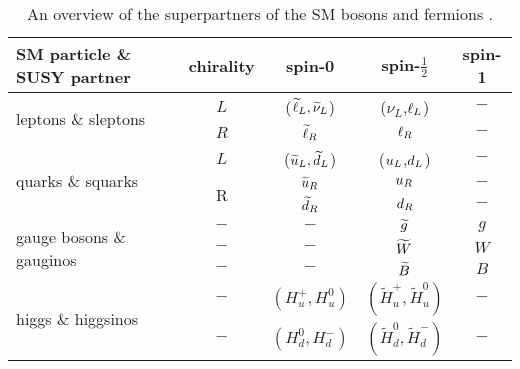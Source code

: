 \begin{table}[ht!]
\def\arraystretch{1.2}
\setlength{\belowcaptionskip}{6pt}
\small
\centering
\caption{An overview of the superpartners of the SM bosons and fermions \cite{Martin:1997ns}.}
\label{tab:susy}
\begin{tabular}{l c c c c }
        \hline \hline
        SM particle \& SUSY partner              & chirality         &spin-0                 & spin-$\frac{1}{2}$                              &spin-1 \\\hline
        \multirow{2}{*}{leptons \& sleptons}     & $L$               &($\widetilde{\ell}_{L},\widetilde{\nu}_{L}$)      & ($\nu_{L}$,$\ell_{L}$)                             &$-$    \\
                                                 & $R$               &$\widetilde{\ell}_{R}$               & $\ell_{R}$                                         &$-$    \\\hline
        \multirow{3}{*}{quarks \& squarks}       & $L$               &($\widetilde{u}_{L},\widetilde{d}_{L}$)      & ($u_{L}$,$d_{L}$)                               &$-$    \\
                                                 & \multirow{2}{*}{R}&$\widetilde{u}_{R}$                & $u_{R}$                                          &$-$    \\
                                                 &                   &$\widetilde{d}_{R}$              & $d_{R}$                                        &$-$    \\\hline
        \multirow{3}{*}{gauge bosons \& gauginos}& $-$               &$-$                    & $\widetilde{g}$                                       &$g$    \\
                                                 & $-$               &$-$                    & $\widetilde{W}$                                         &$W$    \\
                                                 & $-$               &$-$                    & $\widetilde{B}$                                         &$B$    \\\hline
        \multirow{2}{*}{higgs \& higgsinos}      & $-$               &$(H^{+}_{u},H^{0}_{u})$& $(\widetilde{H}^{+}_{u},\widetilde{H}^{0}_{u})$ &$-$    \\
                                                 & $-$               &$(H^{0}_{d},H^{-}_{d})$& $(\widetilde{H}^{0}_{d},\widetilde{H}^{-}_{d})$ &$-$    \\
\hline\hline
\end{tabular}
\end{table}                                                                                                                                                                                             
